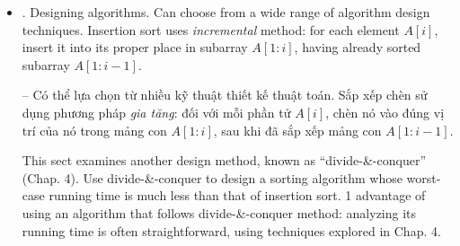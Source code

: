 \documentclass{article}
\newtheorem{problem}{Problem}
\begin{document}
\begin{itemize}
\begin{itemize}
\begin{itemize}
\begin{problem}[\cite{Cormen_Leiserson_Rivest_Stein_algorithm}, 2.2-3, p. 64]
                -- Xem xét lại tìm kiếm tuyến tính. Trung bình cần kiểm tra bao nhiêu phần tử của mảng đầu vào, giả sử: phần tử đang được tìm kiếm có khả năng là bất kỳ phần tử nào trong mảng? Còn trong trường hợp xấu nhất thì sao? Sử dụng ký hiệu $\Theta$, đưa ra thời gian chạy trường hợp trung bình \& trường hợp xấu nhất của tìm kiếm tuyến tính. Giải thích câu trả lời.
            \end{problem}
            
            \begin{problem}[\cite{Cormen_Leiserson_Rivest_Stein_algorithm}, 2.2-4, p. 64]
                How can you modify any sorting algorithm to have a good best-case running time?
                
                -- Làm thế nào bạn có thể sửa đổi bất kỳ thuật toán sắp xếp nào để có thời gian chạy tốt nhất?
            \end{problem}
            
            \item {. Designing algorithms.} Can choose from a wide range of algorithm design techniques. Insertion sort uses {\it incremental} method: for each element $A[i]$, insert it into its proper place in subarray $A[1:i]$, having already sorted subarray $A[1:i - 1]$.
            
            -- Có thể lựa chọn từ nhiều kỹ thuật thiết kế thuật toán. Sắp xếp chèn sử dụng phương pháp {\it gia tăng}: đối với mỗi phần tử $A[i]$, chèn nó vào đúng vị trí của nó trong mảng con $A[1:i]$, sau khi đã sắp xếp mảng con $A[1:i - 1]$.
            
            This sect examines another design method, known as ``divide-\&-conquer'' (Chap. 4). Use divide-\&-conquer to design a sorting algorithm whose worst-case running time is much less than that of insertion sort. 1 advantage of using an algorithm that follows divide-\&-conquer method: analyzing its running time is often straightforward, using techniques explored in Chap. 4.
            

\end{itemize}
\end{itemize}
\end{itemize}
\end{document}
